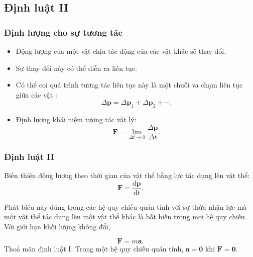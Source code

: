 \subsection{Định luật II}
\begin{frame}
    \frametitle{Định lượng cho sự tương tác}
    \begin{itemize}
        \item Động lượng của một vật chịu tác động của các vật khác sẽ thay đổi.
        \item Sự thay đổi này có thể diễn ra liên tục. 
        \item Có thể coi quá trình tương tác liên tục này là một chuỗi va chạm liên tục giữa các vật : \[\Delta\mathbf{p}=\Delta \mathbf{p}_1 +\Delta\mathbf{p}_2 +\cdots.\]
        \item Định lượng khái niệm tương tác vật lý:
        \[\mathbf{F}=\lim_{\Delta t\to 0}\frac{\Delta\mathbf{p}}{\Delta t}.\] 
        
    \end{itemize}
\end{frame}
\begin{frame}
    \frametitle{Định luật II}
    \vspace{-5pt}

    \begin{tcolorbox}[colback=blue!10, colframe=blue!50!black, title=Lực]
        Biến thiên động lượng theo thời gian của vật thể bằng lực tác dụng lên vật thể:
        \begin{equation}
            \mathbf{F}=\frac{\text{d}\mathbf{p}}{\text{d}t}.
        \end{equation}
    \end{tcolorbox}
    Phát biểu này đúng trong các hệ quy chiếu quán tính với sự thừa nhận lực mà một vật thể tác dụng lên một vật thể khác là bất biến trong mọi hệ quy chiếu.\newline
    Với giới hạn khối lượng không đổi,
    \vspace{-2pt}

    \begin{equation}
        \mathbf{F}=m\mathbf{a}.
    \end{equation}
    Thoả mãn định luật I: Trong một hệ quy chiếu quán tính, \(\mathbf{a}=\mathbf{0}\) khi \(\mathbf{F}=\mathbf{0}\).
\end{frame}
